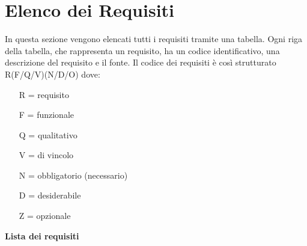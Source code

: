 \chapter{Elenco dei Requisiti}
\label{cap:appendice b}
In questa sezione vengono elencati tutti i requisiti tramite una tabella. Ogni riga della tabella, che rappresenta un requisito, ha un codice identificativo, una descrizione del requisito e il fonte.
Il codice dei requisiti è così strutturato R(F/Q/V)(N/D/O) dove:
\begin{enumerate}
	\item[R =] requisito
    \item[F =] funzionale
    \item[Q =] qualitativo
    \item[V =] di vincolo
    \item[N =] obbligatorio (necessario)
    \item[D =] desiderabile
    \item[Z =] opzionale
\end{enumerate}
\textbf{Lista dei requisiti}
